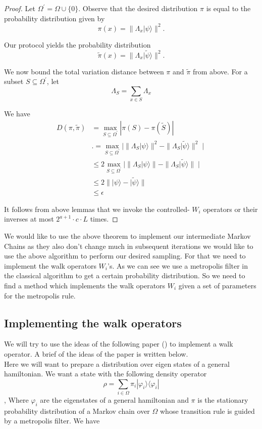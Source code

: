 \begin{proof}
	Let $\Omega^{\prime}=\Omega \cup\{0\}$. Observe that the desired distribution $\pi$ is equal to the probability distribution given by
	$$
	\pi(x)=\| \Lambda_x|\psi\rangle \|^2 .
	$$
	
	Our protocol yields the probability distribution
	$$
	\tilde{\pi}(x)=\| \Lambda_x|\tilde{\psi}\rangle \|^2 .
	$$
	
	We now bound the total variation distance between $\pi$ and $\tilde{\pi}$ from above. For a subset $S \subseteq \Omega^{\prime}$, let
	$$
	\Lambda_S=\sum_{x \in S} \Lambda_x
	$$
	
	We have
	$$
	\begin{aligned}
		D(\pi, \tilde{\pi}) & =\max _{S \subseteq \Omega^{\prime}}|\pi(S)-\pi(\tilde{S})| \\
		& .=\max _{S \subseteq \Omega^{\prime}}|\| \Lambda_S| \psi\rangle \|^2-\| \Lambda_S|\tilde{\psi}\rangle \|^2 \mid \\
		& \leq 2 \max _{S \subseteq \Omega^{\prime}}|\| \Lambda_S| \psi\rangle \|-\| \Lambda_S|\tilde{\psi}\rangle \| \mid \\
		& \leq 2 \||\psi\rangle-|\tilde{\psi}\rangle \| \\
		& \leq \epsilon
	\end{aligned}
	$$
	
	It follows from above lemmas that we invoke the controlled- $W_i$ operators or their inverses at most $2^{a+1} \cdot c \cdot L$ times.
\end{proof}
\break
We would like to use the above theorem to implement our intermediate Markov Chains as they also don't change much in subsequent iterations we would like to use the above algorithm to perform our desired sampling. For that we need to implement the walk operators $W_i$'s. As we can see we use a metropolis filter in the classical algorithm to get a certain probability distribution. So we need to find a method which implements the walk operators  $W_i$ given a set of parameters for the metropolis rule.
\subsection{Implementing the walk operators} We will try to use the  ideas of the following paper () to implement a walk operator. A brief of the ideas of the paper is written below. 
\\ Here we will want to prepare a distribution over eigen states of a general hamiltonian. We want a state with the following density operator 
$$\rho= \sum_{i \in \Omega}\pi_i|\varphi_i\rangle \langle\varphi_i|$$, Where $\varphi_i$ are the  eigenstates of a general hamiltonian and $\pi$ is the stationary probability distribution of a Markov chain over $\Omega$ whose transition rule is guided by a metropolis filter. We have


